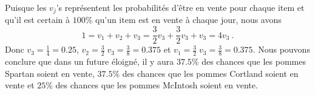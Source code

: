 {Puisque les $v_j$'s représentent les probabilités d'être en vente pour
chaque item et qu'il est certain à $100$\% qu'un item est en vente à
chaque jour, nous avons
\[
1 = v_1 + v_2 + v_3 = \frac{3}{2} v_3 + \frac{3}{2} v_3 + v_3 = 4 v_3 \ .
\]
Donc $\displaystyle v_3 = \frac{1}{4} = 0.25$,
$\displaystyle v_2 = \frac{3}{2}\; v_3 = \frac{3}{8} = 0.375$ et
$\displaystyle v_1 = \frac{3}{2}\; v_3 = \frac{3}{8} = 0.375$.
Nous pouvons conclure que dans un future éloigné, il y aura $37.5$\%
des chances que les pommes Spartan soient en vente, $37.5$\% des
chances que les pommes Cortland soient en vente et $25$\% des chances
que les pommes McIntosh soient en vente.
}

